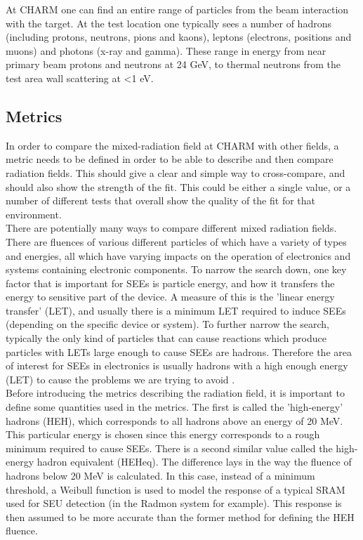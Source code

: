 At CHARM one can find an entire range of particles from the beam interaction with the target. At the test location one typically sees a number of hadrons (including protons, neutrons, pions and kaons), leptons (electrons, positions and muons) and photons (x-ray and gamma). These range in energy from near primary beam protons and neutrons at 24 GeV, to thermal neutrons from the test area wall scattering at \textless 1 eV. \\

\subsection{Metrics}

In order to compare the mixed-radiation field at CHARM with other fields, a metric needs to be defined in order to be able to describe and then compare radiation fields. This should give a clear and simple way to cross-compare, and should also show the strength of the fit. This could be either a single value, or a number of different tests that overall show the quality of the fit for that environment. \\

There are potentially many ways to compare different mixed radiation fields. There are fluences of various different particles of which have a variety of types and energies, all which have varying impacts on the operation of electronics and systems containing electronic components. To narrow the search down, one key factor that is important for SEEs is particle energy, and how it transfers the energy to sensitive part of the device. A measure of this is the 'linear energy transfer' (LET), and usually there is a minimum LET required to induce SEEs (depending on the specific device or system). To further narrow the search, typically the only kind of particles that can cause reactions which produce particles with LETs large enough to cause SEEs are hadrons. Therefore the area of interest for SEEs in electronics is usually hadrons with a high enough energy (LET) to cause the problems we are trying to avoid \cite{rad_effects_handbook}. \\


Before introducing the metrics describing the radiation field, it is important to define some quantities used in the metrics. The first is called the 'high-energy' hadrons (HEH), which corresponds to all hadrons above an energy of 20 MeV. This particular energy is chosen since this energy corresponds to a rough minimum required to cause SEEs. There is a second similar value called the high-energy hadron equivalent (HEHeq). The difference lays in the way the fluence of hadrons below 20 MeV is calculated. In this case, instead of a minimum threshold, a Weibull function is used to model the response of a typical SRAM used for SEU detection (in the Radmon system for example). This response is then assumed to be more accurate than the former method for defining the HEH fluence. \\ 

